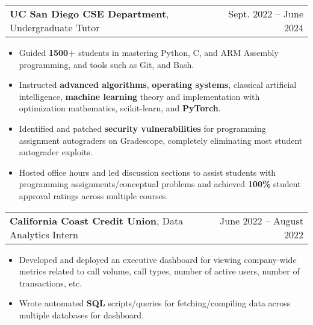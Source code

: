 \documentclass[letterpaper, 10pt]{article}
\makeatletter
\newcommand{\resumeItem}[1]{
  \item\small{
    {#1 \vspace{-2pt}}
  }
}
\newcommand{\altSubheading}[3]{
  \vspace{4pt}\item
    \begin{tabular*}{0.97\textwidth}[t]{l@{\extracolsep{\fill}}r}
      \textbf{#1}, {#2} & #3 \\
    \end{tabular*}\vspace{-7pt}
}
\newcommand{\resumeSubSubheading}[2]{
    \item
    \begin{tabular*}{0.97\textwidth}{l@{\extracolsep{\fill}}r}
      \textit{\small#1} & \textit{\small #2} \\
    \end{tabular*}\vspace{-7pt}
}
\newcommand{\resumeSubHeadingListEnd}{\end{itemize}}
\newcommand{\resumeItemListStart}{\begin{itemize}}
\newcommand{\resumeItemListEnd}{\end{itemize}\vspace{-4pt}}
\makeatother
\begin{document}

    \altSubheading
    {UC San Diego CSE Department}{Undergraduate Tutor}{Sept. 2022 -- June 2024}
      \resumeItemListStart
        \resumeItem{Guided \textbf{1500+} students in mastering Python, C, and ARM Assembly programming, and tools such as Git, and Bash. }
        \resumeItem{Instructed \textbf{advanced algorithms}, \textbf{operating systems}, classical artificial intelligence, \textbf{machine learning} theory and implementation with optimization mathematics, scikit-learn, and \textbf{PyTorch}. }
        \resumeItem{Identified and patched \textbf{security vulnerabilities} for programming assignment autograders on Gradescope, completely eliminating most student autograder exploits.}
        \resumeItem{Hosted office hours and led discussion sections to assist students with programming assignments/conceptual problems and achieved \textbf{100\%} student approval ratings across multiple courses.}
      \resumeItemListEnd

    \altSubheading
      {California Coast Credit Union}{Data Analytics Intern}{June 2022 -- August 2022}
      \resumeItemListStart
        \resumeItem{Developed and deployed an executive dashboard for viewing company-wide metrics related to call volume, call types, number of active users, number of transactions, etc. }
        \resumeItem{Wrote automated \textbf{SQL} scripts/queries for fetching/compiling data across multiple databases for dashboard.}
      \resumeItemListEnd
\end{document}
